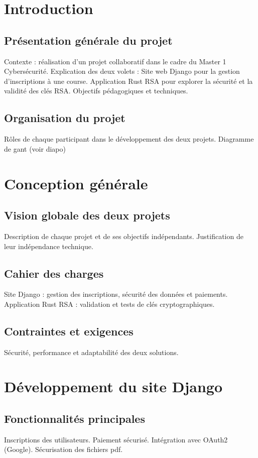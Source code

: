 \documentclass[12pt]{article} %
\begin{document}
\section{Introduction}
	\subsection{Présentation générale du projet}
		Contexte : réalisation d’un projet collaboratif dans le cadre du Master 1 Cybersécurité.
Explication des deux volets :
Site web Django pour la gestion d’inscriptions à une course.
Application Rust RSA pour explorer la sécurité et la validité des clés RSA.
Objectifs pédagogiques et techniques.
	
			
		
	\subsection{Organisation du projet}
		Rôles de chaque participant dans le développement des deux projets.
		Diagramme de gant (voir diapo)
	



\section{Conception générale}
	\subsection{Vision globale des deux projets}
		Description de chaque projet et de ses objectifs indépendants.
Justification de leur indépendance technique.

	
	\subsection{Cahier des charges}
		Site Django : gestion des inscriptions, sécurité des données et paiements.
Application Rust RSA : validation et tests de clés cryptographiques.

	
	\subsection{Contraintes et exigences}
		Sécurité, performance et adaptabilité des deux solutions.


\section{Développement du site Django}
	\subsection{Fonctionnalités principales}
		Inscriptions des utilisateurs.
Paiement sécurisé.
Intégration avec OAuth2 (Google).
Sécurisation des fichiers pdf.
\end{document}
